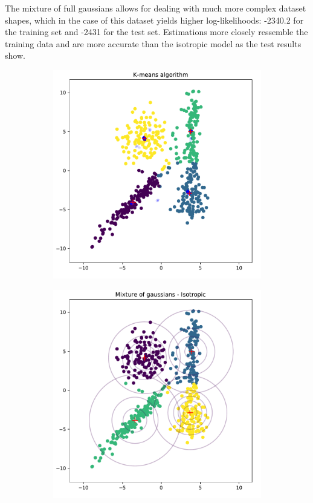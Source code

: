 \documentclass[11pt, oneside]{amsart}   	%
\begin{document}
The mixture of full gaussians allows for dealing with much more complex dataset shapes, which in the case of this dataset yields higher log-likelihoods: -2340.2 for the training set and -2431 for the test set. Estimations more closely ressemble the training data and are more accurate than the isotropic model as the test results show.
\vfill
 \clearpage
 \begin{figure}[t!]
\centering
\begin{subfigure}{.49\textwidth}
  \centering
  \includegraphics[width=\linewidth]{KMeans.pdf}

\end{subfigure} 
\begin{subfigure}{.49\textwidth}
  \centering
  \includegraphics[width=\linewidth]{Isotropic.pdf}


\end{subfigure}
\end{figure}
\end{document}
